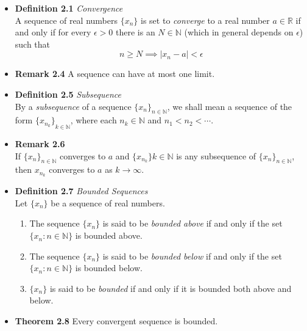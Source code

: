 \documentclass[11pt,a4paper]{article}
\begin{document}
\begin{itemize}
    \item \textbf{Definition 2.1} \emph{Convergence} \\
        A sequence of real numbers $\{ x_n \}$ is set to \emph{converge} to a real number
        $a \in \mathbb{R}$ if and only if for every $\epsilon > 0$ there is an $N \in \mathbb{N}$
        (which in general depends on $\epsilon$) such that
        \[
            n \geq N \implies |x_n - a| < \epsilon
        \]

    \item \textbf{Remark 2.4}
        A sequence can have at most one limit.

    \item \textbf{Definition 2.5} \emph{Subsequence} \\
        By a \emph{subsequence} of a sequence ${\{x_n\}}_{n \in \mathbb{N}}$,
        we shall mean a sequence of the form ${\{x_n_k\}}_{k \in \mathbb{N}}$,
        where each $n_k \in \mathbb{N}$ and $n_1 < n_2 < \cdots$.

    \item \textbf{Remark 2.6} \\
        If ${ \{x_n\} }_{n \in \mathbb{N}}$ converges to $a$ and
        ${ \{x_n_k\} }{k \in \mathbb{N}}$ is any subsequence of
        ${ \{x_n\} }_{n \in \mathbb{N}}$, then $x_n_k$ converges to $a$ as $k \to \infty$.

    \item \textbf{Definition 2.7} \emph{Bounded Sequences} \\
        Let $\{ x_n \}$ be a sequence of real numbers.
        \begin{enumerate}
            \item The sequence $\{ x_n \}$ is said to be \emph{bounded above} if and only if
                the set $ \{ x_n : n \in \mathbb{N} \}$ is bounded above.
            \item The sequence $\{ x_n \}$ is said to be \emph{bounded below} if and only if
                the set $\{ x_n : n \in \mathbb{N} \}$ is bounded below.
            \item $\{ x_n \}$ is said to be \emph{bounded} if and only if it is bounded both
                above and below.
        \end{enumerate}

    \item \textbf{Theorem 2.8}
        Every convergent sequence is bounded.
\end{itemize}
\end{document}
